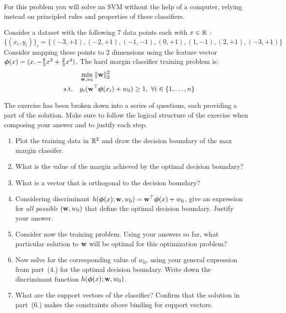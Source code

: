 \documentclass[submit]{harvardml}
\begin{document}
\newpage
\begin{problem}
  For this problem you will solve an SVM without the help of a
  computer, relying instead on principled rules and properties of
  these classifiers.

Consider a dataset with the following 7 data points each with $x \in \mathbb{R}$ : \[\{(x_i, y_i)\}_i =\{(-3 , +1) , (-2 , +1 ) , (-1,  -1 ), (0, +1), ( 1 , -1 ), ( 2 , +1 ) , (-3 , +1 )\}\] Consider
mapping these points to $2$ dimensions using the feature vector $\boldsymbol{\phi}(x) =  (x, -\frac{8}{3}x^2 + \frac{2}{3}x^4 )$. The hard margin classifier training problem is:
%
\begin{align*}
  &\min_{\mathbf{w}, w_0} \|\mathbf{w}\|_2^2 \label{eq:dcp} \\
  \quad \text{s.t.} \quad & y_i(\mathbf{w}^\top \boldsymbol{\phi}(x_i) + w_0) \geq 1,~\forall i \in \{1,\ldots, n\}\notag
\end{align*}

The exercise has been broken down into a series of questions, each
providing a part of the solution. Make sure to follow the logical structure of
the exercise when composing your answer and to justify each step.

\begin{enumerate}
\item Plot the training data in $\mathbb{R}^2$ and draw the decision boundary
of the max margin classifer.
%
\item  What is the value of the margin achieved by the optimal
decision boundary? 
%
\item What is a vector that is orthogonal to the decision boundary?

%
\item Considering discriminant $h(\boldsymbol{\phi}(x);\mathbf{w},w_0)=\mathbf{w}^\top\boldsymbol{\phi}(x) +w_0$, 
give an expression for {\em all possible} $(\mathbf{w},w_0)$ that define
the optimal decision boundary. Justify your answer.

  \item Consider now the training problem. Using your answers so far,
    what particular solution to $\mathbf{w}$ will be optimal for this
    optimization problem?

  \item Now solve for the corresponding value of $w_0$, using your
    general expression from part~(4.) for the optimal decision
    boundary.  Write down the discriminant function
    $h(\boldsymbol{\phi}(x);\mathbf{w},w_0)$.


\item What are the support vectors of the classifier?  Confirm that
  the solution in part~(6.) makes the constraints above binding for
  support vectors.

\end{enumerate}

\end{problem}
\end{document}
